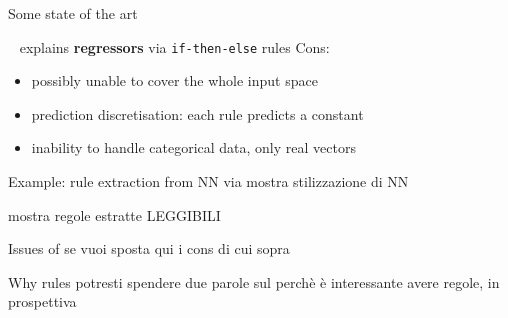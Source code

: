\documentclass[presentation]{beamer}
\begin{document}
\begin{frame}[allowframebreaks]{Some state of the art}
\begin{block}{\iter~ explains \textbf{regressors} via \texttt{if-then-else} rules}
		Cons:
		\begin{itemize}
			\item possibly unable to cover the whole input space
			\item prediction discretisation: each rule predicts a constant
			\item inability to handle categorical data, only real vectors
		\end{itemize}
	\end{block}

	\framebreak

	\begin{exampleblock}{Example: rule extraction from NN via \iter}
		mostra stilizzazione di NN

		mostra regole estratte LEGGIBILI
	\end{exampleblock}

	\begin{alertblock}{Issues of \iter}
		se vuoi sposta qui i cons di cui sopra
	\end{alertblock}

	\framebreak

	\begin{block}{Why rules}
		potresti spendere due parole sul perchè è interessante avere regole, in prospettiva
	\end{block}

\end{frame}
\end{document}
